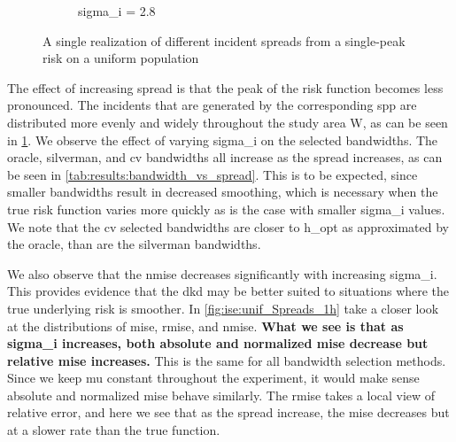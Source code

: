 \begin{figure}[htbp]
\begin{subfigure}{0.45\textwidth}
        \caption{\gls{sigma_i} = 2.8}
    \end{subfigure}
    \caption[Examples showing incident spread]
        {A single realization of different incident \glspl{spread} from a single-peak risk on a uniform population}
    \label{fig:one_sample:unif_Spreads_1h}
\end{figure}

The effect of increasing \gls{spread} is that the peak of the risk function becomes less pronounced.
The incidents that are generated by the corresponding \gls{spp} are distributed more evenly and widely throughout the study area \gls{W},
as can be seen in \cref{fig:one_sample:unif_Spreads_1h}.
We observe the effect of varying \gls{sigma_i} on the selected bandwidths.
The \gls{oracle}, \gls{silverman}, and \gls{cv} bandwidths all increase as the spread increases, as can be seen in \cref{tab:results:bandwidth_vs_spread}.
This is to be expected, since smaller bandwidths result in decreased smoothing,
which is necessary when the true risk function varies more quickly as is the case with smaller \gls{sigma_i} values.
We note that the \gls{cv} selected bandwidths are closer to \gls{h_opt} as approximated by the \gls{oracle}, than are the \gls{silverman} bandwidths.



We also observe that the \gls{nmise} decreases significantly with increasing \gls{sigma_i}.
This provides evidence that the \gls{dkd} may be better suited to situations where the true underlying risk is smoother.
In \cref{fig:ise:unif_Spreads_1h} take a closer look at the distributions of \gls{mise}, \gls{rmise}, and \gls{nmise}.
\textbf{What we see is that as \gls{sigma_i} increases, both absolute and normalized \gls{mise} decrease but relative \gls{mise} increases.}
This is the same for all bandwidth selection methods.
Since we keep \gls{mu} constant throughout the experiment, it would make sense absolute and normalized \gls{mise} behave similarly.
The \gls{rmise} takes a local view of relative error, and here we see that as the \gls{spread} increase, the \gls{mise} decreases but at a slower rate than the true function.


